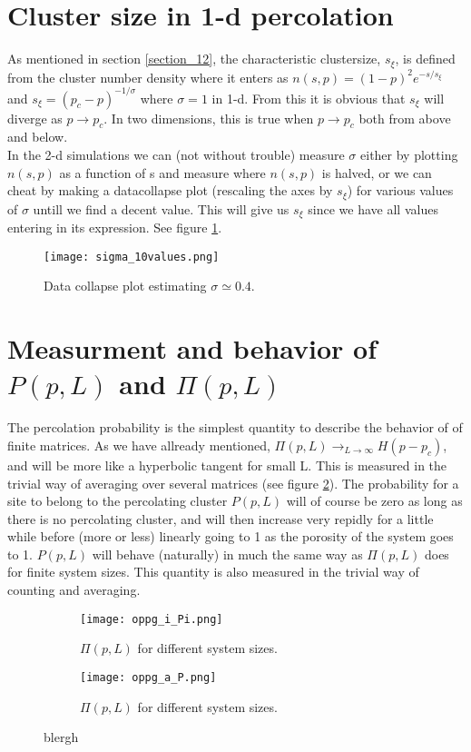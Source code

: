 \documentclass[a4paper,english, 10pt, twoside]{article}
\begin{document}
\section{Cluster size in 1-d percolation}
As mentioned in section \ref{section_12}, the characteristic clustersize, $s_\xi$, is defined from the cluster number density where 
it enters as $n(s,p) = (1-p)^2e^{-s/s_\xi}$ and $s_\xi = (p_c-p)^{-1/\sigma}$ where $\sigma=1$ in 1-d. From this it is obvious that $s_\xi$ 
will diverge as $p\to p_c$. In two dimensions, this is true when $p\to p_c$ both from above and below. \\
In the 2-d simulations we can (not without trouble) measure $\sigma$ either by plotting $n(s,p)$ as a function of s and measure where 
$n(s,p)$ is halved, or we can cheat by making a datacollapse plot (rescaling the axes by $s_\xi$) for various values of $\sigma$ untill 
we find a decent value. This will give us $s_\xi$ since we have all values entering in its expression. See figure \ref{sigma}.
\begin{figure}[H]
\centering
\texttt{[image: sigma\_10values.png]}
\caption{Data collapse plot estimating $\sigma \simeq 0.4$.}
\label{sigma}
\end{figure}


\section{Measurment and behavior of $P(p,L)$ and $\Pi(p,L)$}\label{section_15}
The percolation probability is the simplest quantity to describe the behavior of of finite matrices. As we have 
allready mentioned, $\Pi(p,L)\to_{L\to\infty}H(p-p_c)$, and will be more like a hyperbolic tangent for small L. 
This is measured in the trivial way of averaging over several matrices (see figure \ref{sect_15:pi}). The probability 
for a site to belong to the percolating cluster $P(p,L)$ will of course be zero as long as there is no percolating 
cluster, and will then increase very repidly for a little while before (more or less) linearly going to 1 as the 
porosity of the system goes to 1. $P(p,L)$ will behave (naturally) in much the same way as $\Pi(p,L)$ does for finite 
system sizes. This quantity is also measured in the trivial way of counting and averaging.

\begin{figure}[H]
\centering
\begin{subfigure}[b]{0.48\textwidth}
 \texttt{[image: oppg\_i\_Pi.png]}
 \caption{$\Pi(p,L)$ for different system sizes.}
 \label{sect_15:pi}
\end{subfigure}
\begin{subfigure}[b]{0.48\textwidth}
  \texttt{[image: oppg\_a\_P.png]}
 \caption{$\Pi(p,L)$ for different system sizes.}
 \label{sect_15:P}
\end{subfigure}
\caption{blergh}
\label{sect_15}
\end{figure}
\end{document}
